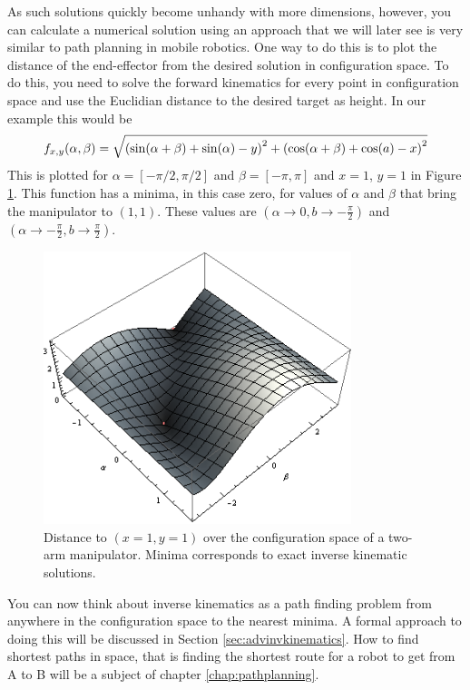 As such solutions quickly become unhandy with more dimensions, however, you can calculate a numerical solution using an approach that we will later see is very similar to path planning in mobile robotics. One way to do this is to plot the distance of the end-effector from the desired solution in configuration space. To do this, you need to solve the forward kinematics for every point in configuration space and use the Euclidian distance to the desired target as height. In our example this would be
\begin{equation}
\small
f_{x,y}(\alpha,\beta)=\sqrt{\left(\sin(\alpha + \beta) + \sin(\alpha) - y\right)^2 + \left(\cos(\alpha+\beta)+\cos(a) - x\right)^2}
\end{equation}
This is plotted for $\alpha=[-\pi/2,\pi/2]$ and $\beta=[-\pi,\pi]$ and $x=1$, $y=1$ in Figure \ref{fig:inversekinematics}. This function has a minima, in this case zero, for values of $\alpha$ and $\beta$ that bring the manipulator to $(1,1)$. These values are $(\alpha \rightarrow 0, b \rightarrow -\frac{\pi}{2})$ and $(\alpha \rightarrow -\frac{\pi}{2}, b \rightarrow \frac{\pi}{2})$.

\begin{figure}
	\centering
		\includegraphics[width=0.8\textwidth]{figs/inversekinematics}
	\caption{Distance to $(x=1,y=1)$ over the configuration space of a two-arm manipulator. Minima corresponds to exact inverse kinematic solutions.}
	\label{fig:inversekinematics}
\end{figure}

You can now think about inverse kinematics as a path finding problem from anywhere in the configuration space to the nearest minima. A formal approach to doing this will be discussed in Section \ref{sec:advinvkinematics}. How to find shortest paths in space, that is finding the shortest route for a robot to get from A to B will be a subject of chapter \ref{chap:pathplanning}.

